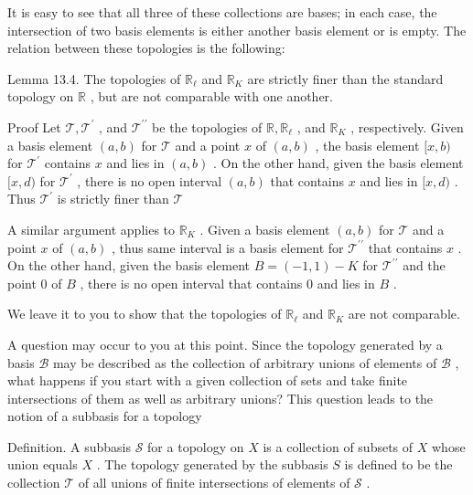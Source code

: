 \documentclass[10pt]{article}
\begin{document}
It is easy to see that all three of these collections are bases; in each case, the intersection of two basis elements is either another basis element or is empty. The relation between these topologies is the following:

Lemma 13.4. The topologies of \({\mathbb{R}}_{\ell }\) and \({\mathbb{R}}_{K}\) are strictly finer than the standard topology on \(\mathbb{R}\) , but are not comparable with one another.

Proof Let \(\mathcal{T},{\mathcal{T}}^{\prime }\) , and \({\mathcal{T}}^{\prime \prime }\) be the topologies of \(\mathbb{R},{\mathbb{R}}_{\ell }\) , and \({\mathbb{R}}_{K}\) , respectively. Given a basis element \(\left( {a,b}\right)\) for \(\mathcal{T}\) and a point \(x\) of \(\left( {a,b}\right)\) , the basis element \(\lbrack x,b)\) for \({\mathcal{T}}^{\prime }\) contains \(x\) and lies in \(\left( {a,b}\right)\) . On the other hand, given the basis element \(\lbrack x,d)\) for \({\mathcal{T}}^{\prime }\) , there is no open interval \(\left( {a,b}\right)\) that contains \(x\) and lies in \(\lbrack x,d)\) . Thus \({\mathcal{T}}^{\prime }\) is strictly finer than \(\mathcal{T}\)

A similar argument applies to \({\mathbb{R}}_{K}\) . Given a basis element \(\left( {a,b}\right)\) for \(\mathcal{T}\) and a point \(x\) of \(\left( {a,b}\right)\) , thus same interval is a basis element for \({\mathcal{T}}^{\prime \prime }\) that contains \(x\) . On the other hand, given the basis element \(B = \left( {-1,1}\right)  - K\) for \({\mathcal{T}}^{\prime \prime }\) and the point 0 of \(B\) , there is no open interval that contains 0 and lies in \(B\) .

We leave it to you to show that the topologies of \({\mathbb{R}}_{\ell }\) and \({\mathbb{R}}_{K}\) are not comparable.

A question may occur to you at this point. Since the topology generated by a basis \(\mathcal{B}\) may be described as the collection of arbitrary unions of elements of \(\mathcal{B}\) , what happens if you start with a given collection of sets and take finite intersections of them as well as arbitrary unions? This question leads to the notion of a subbasis for a topology

Definition. A subbasis \(\mathcal{S}\) for a topology on \(X\) is a collection of subsets of \(X\) whose union equals \(X\) . The topology generated by the subbasis \(S\) is defined to be the collection \(\mathcal{T}\) of all unions of finite intersections of elements of \(\mathcal{S}\) .
\end{document}
